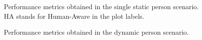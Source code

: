 \begin{figure}[t!]
\caption{Performance metrics obtained in the single static person scenario. HA stands for Human-Aware in the plot labels.
}
\label{fig:boxplots_singlePerson}
\end{figure}

\begin{figure}[!]
\centering
{}%
\hspace{0.1cm}
%

\caption{Performance metrics obtained in the dynamic person scenario. %
}
\label{fig:boxplots_singlePersonMov}
\end{figure}

